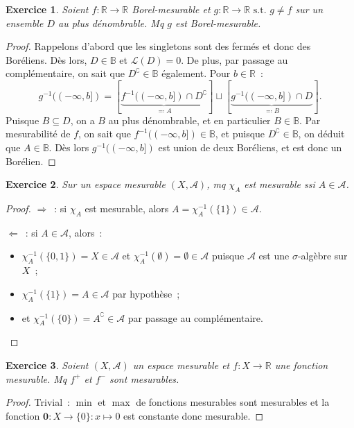 \documentclass{article}
\newtheorem{ex}{Exercice}[section]
\newcommand{\minfty}{{-\infty}}
\newcommand{\st}{\text{ s.t. }}
\newcommand{\C}{\complement}
\newcommand{\R}{{\mathbb R}}
\newcommand{\B}{{\mathbb B}}
\begin{document}
\begin{ex} Soient $f : \R \to \R$ Borel-mesurable et $g : \R \to \R \st g \neq f$ sur un ensemble $D$ au plus dénombrable. Mq $g$ est Borel-mesurable.
\end{ex}

\begin{proof} Rappelons d'abord que les singletons sont des fermés et donc des Boréliens. Dès lors, $D \in \B$ et $\mathcal L(D) = 0$. De plus, par passage au complémentaire,
on sait que $D^\C \in \B$ également. Pour $b \in \R$~:
\[g^{-1}((\minfty, b]) = \left[\underbrace {f^{-1}((\minfty, b]) \cap D^\C}_{\eqqcolon A}\right] \sqcup \left[\underbrace {g^{-1}((\minfty, b]) \cap D}_{\eqqcolon B}\right].\]
Puisque $B \subseteq D$, on a $B$ au plus dénombrable, et en particulier $B \in \B$. Par mesurabilité de $f$, on sait que $f^{-1}((\minfty, b]) \in \B$, et puisque $D^\C \in \B$,
on déduit que $A \in \B$. Dès lors $g^{-1}((\minfty, b])$ est union de deux Boréliens, et est donc un Borélien.
\end{proof}

\begin{ex} Sur un espace mesurable $(X, \mathcal A)$, mq $\chi_A$ est mesurable ssi $A \in \mathcal A$.
\end{ex}

\begin{proof} \underline {$\Rightarrow$}~: si $\chi_A$ est mesurable, alors $A = \chi_A^{-1}(\{1\}) \in \mathcal A$.

\underline {$\Leftarrow$}~: si $A \in \mathcal A$, alors~:
\begin{itemize}
	\item $\chi_A^{-1}(\{0, 1\}) = X \in \mathcal A$ et $\chi_A^{-1}(\emptyset) = \emptyset \in \mathcal A$ puisque $\mathcal A$ est une $\sigma$-algèbre sur $X$~;
	\item $\chi_A^{-1}(\{1\}) = A \in \mathcal A$ par hypothèse~;
	\item et $\chi_A^{-1}(\{0\}) = A^\C \in \mathcal A$ par passage au complémentaire.
\end{itemize}
\end{proof}

\begin{ex} Soient $(X, \mathcal A)$ un espace mesurable et $f : X \to \R$ une fonction mesurable. Mq $f^+$ et $f^-$ sont mesurables.
\end{ex}

\begin{proof} Trivial~: $\min$ et $\max$ de fonctions mesurables sont mesurables et la fonction $\mathbf 0 : X \to \{0\} : x \mapsto 0$ est constante donc mesurable.
\end{proof}
\end{document}
